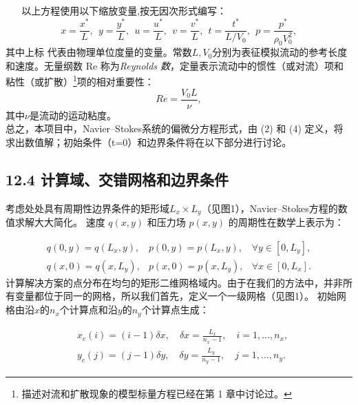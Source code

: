 \documentclass[12pt, a4paper, oneside]{ctexart}
\begin{document}
    $ \ \ \ \ \ \    $ 以上方程使用以下缩放变量,按无因次形式编写：
    \begin{equation}
        x=\frac{x^*}{L},\  \ y=\frac{y^*}{L}, \ \ u=\frac{u^*}{L},\ \ v=\frac{v^*}{L},\ \ t=\frac{t^*}{L/V_0},\ \ p=\frac{p^*}{\rho_0 V_0^2},\label{E5}
    \end{equation}
    其中上标 \text{(*)}代表由物理单位度量的变量。常数$L,V_0$分别为表征模拟流动的参考长度和速度。无量纲数 Re 称为\emph{Reynolds 数}，定量表示流动中的惯性（或对流）项和粘性（或扩散）\footnote{描述对流和扩散现象的模型标量方程已经在第 1 章中讨论过。}项的相对重要性：
    \begin{equation}
        Re =  \frac{V_0L}{\nu},\label{E6}
    \end{equation}
    其中$\nu$是流动的运动粘度。\\
    \text{  \  \ \  \ \ \ } 总之，本项目中，Navier–Stokes系统的偏微分方程形式，由 (2) 和 (4) 定义，将求出数值解；初始条件（t=0）和边界条件将在以下部分进行讨论。
{\raggedright\subsection*{12.4 计算域、交错网格和边界条件}}
{\raggedright
考虑处处具有周期性边界条件的矩形域$L_x×L_y$（见图1），Navier–Stokes方程的数值求解大大简化。
速度 $q(x, y)$ 和压力场 $p(x, y)$ 的周期性在数学上表示为：

}
\begin{equation}
    \begin{array}{lll}
        q(0, y)=q\left(L_x, y\right), & p(0, y)=p\left(L_x, y\right), & \forall y \in\left[0, L_y\right], \\
        q(x, 0)=q\left(x, L_y\right), & p(x, 0)=p\left(x, L_y\right), & \forall x \in\left[0, L_x\right].
        \end{array} \label{E7}
\end{equation}
\text{  \  \ \  \ \ \ }计算解决方案的点分布在均匀的矩形二维网格域内。由于在我们的方法中，并非所有变量都位于同一的网格，所以我们首先，定义一个一级网格（见图1）。
初始网格由沿$x$的$n_x$个计算点和沿$y$的$n_y$个计算点生成：

\begin{align}
& x_c(i)=(i-1) \delta x, \quad \delta x=\frac{L_x}{n_x-1}, \quad i=1, \ldots, n_x, \label{E8}\\
& y_c(j)=(j-1) \delta y, \quad \delta y=\frac{L_y}{n_y-1}, \quad j=1, \ldots, n_y .\label{E9}
\end{align}
\end{document}
